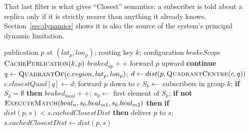 \documentclass[10pt]{article}
\begin{document}
That last filter is what gives ``Closest'' semantics: a subscriber is told about a replica only if it is strictly nearer than anything it already knows. Section~\ref{sec:dynamics} shows it is also the source of the system's principal dynamic limitation.

\begin{algorithm}[t]
\caption{Proximity Routing --- publication handling at a broker}
\label{alg:proximity}
\begin{algorithmic}[1]
\Require publication $p$ at $(lat_p, lon_p)$; routing key $k$; configuration $brakeScope$
\State $\textproc{CachePublication}(k, p)$ 
        \State $braked_{up}{+}{+}$ 
    \Else
        \State forward $p$ upward 
    \EndIf
\EndIf
{}
        \State \textbf{continue} 
    \EndIf
    \State $q \gets \textproc{QuadrantOf}(c.region, lat_p, lon_p)$; \; $d \gets dist(p, \textproc{QuadrantCentre}(c, q))$
     
        \State $c.closestQuad[q] \gets d$; forward $p$ down to $c$
    \EndIf
\EndFor
\State $S_k \gets$ subscribers in group $k$; \textbf{if} $S_k = \emptyset$ \textbf{then} \Return {}
    \State $braked_{local}{+}{+}$; \Return
\EndIf
{} 
    \State $s_0 \gets$ first element of $S_k$; \textbf{if not} $\textproc{ExecuteMatch}(bval_n, s_0.bval_{m1}, s_0.bval_{m2})$ \textbf{then} \Return
\EndIf
{}
    \State \textbf{if} $dist(p, s) < s.cachedClosestDist$ \textbf{then} deliver $p$ to $s$; \; $s.cachedClosestDist \gets dist(p, s)$
\EndFor
\end{algorithmic}
\end{algorithm}
\end{document}
